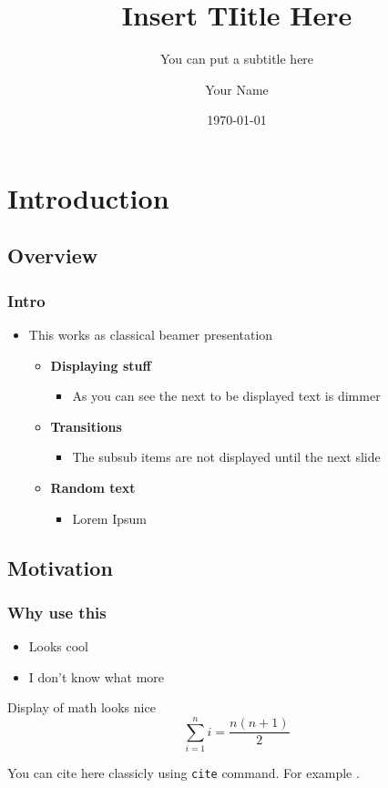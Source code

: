 \documentclass[xcolor={usenames,dvipsnames},aspectratio=169, 12pt]{beamer}
\title{Insert TIitle Here}
\author{Your Name}
\subtitle{You can put a subtitle here}
\institute{Charles University}
\date[\MONTH~\the\day] %
{\today}
\begin{document}
\titleframe

\section{Introduction}
\subsection{Overview}
\begin{frame}
\frametitle{Intro}
  \begin{itemize}
    \item<1-> This works as classical beamer presentation
    \begin{itemize}
      \item<2-> \textbf{Displaying stuff}
      \begin{itemize}
        \item<2-> As you can see the next to be displayed text is dimmer
      \end{itemize}
      \item<3-> \textbf{Transitions}
      \begin{itemize}
        \item<3-> The subsub items are not displayed until the next slide
      \end{itemize}
      \item<4-> \textbf{Random text}
      \begin{itemize}
        \item<4-> Lorem Ipsum
      \end{itemize}
    \end{itemize}
  \end{itemize}
\end{frame}

\subsection{Motivation}
\begin{frame}
\frametitle{Why use this}
\begin{itemize}
  \item Looks cool
\end{itemize}
\begin{itemize}
  \item I don't know what more
\end{itemize}
\begin{block}{Display of math looks nice}
  \begin{equation}
    \sum_{i=1}^{n} i = \frac{n(n+1)}{2}
  \end{equation}
\end{block}
You can cite here classicly using \texttt{cite} command. For example \cite{lapointe1997average}.
\end{frame}
\end{document}
